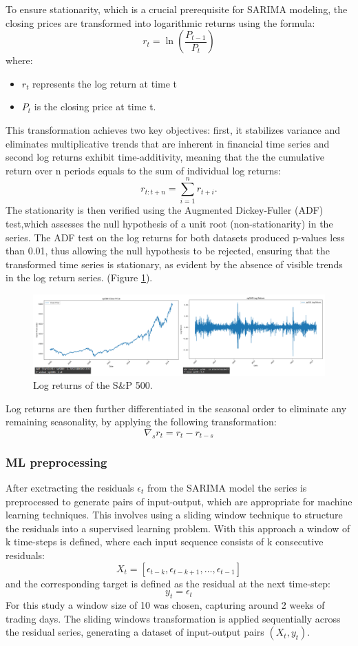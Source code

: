 To ensure stationarity, which is a crucial prerequisite for SARIMA modeling, the closing prices are transformed into logarithmic returns using the formula:
\[
r_t = \ln\left(\frac{P_{t-1}}{P_t}\right)
\]
where: 
\begin{itemize}
    \item $r_t$ represents the log return at time t
    \item $P_t$ is the closing price at time t.
\end{itemize}
This transformation achieves two key objectives: first, it stabilizes variance and eliminates multiplicative trends that are inherent in financial time series and second log returns exhibit time-additivity, meaning that the the cumulative return over n periods equals to the sum of individual log returns:
\[
r_{t:t+n} = \sum_{i=1}^{n} r_{t+i}.
\]
The stationarity is then verified using the Augmented Dickey-Fuller (ADF) test,which assesses the null hypothesis of a unit root (non-stationarity) in the series. The ADF test on the log returns for both datasets produced p-values less than 0.01, thus allowing the null hypothesis to be rejected, ensuring that the transformed time series is stationary, as evident by the absence of visible trends in the log return series. (Figure \ref{fig:Log returns}).
\begin{figure}[H]
    \centering
    \includegraphics[width=1\textwidth]{Machine_learning_thesis/Images/Log returns.png}
    \caption{Log returns of the S\&P 500.} 
    \label{fig:Log returns}
\end{figure}
Log returns are then further differentiated in the seasonal order to eliminate any remaining seasonality, by applying the following transformation: 
\[
\nabla_s r_t = r_t - r_{t-s}
\]

\subsubsection{ML preprocessing}

After exctracting the residuals $\epsilon_t$ from the SARIMA model the series is preprocessed to generate pairs of input-output, which are appropriate for machine learning techniques. This involves using a sliding window technique to structure the residuals into a supervised learning problem. With this approach a window of k time-steps is defined, where each input sequence consists of k consecutive residuals:
\[
X_t = [\epsilon_{t-k}, \epsilon_{t-k+1}, \dots, \epsilon_{t-1}]
\]
and the corresponding target is defined as the residual at the next time-step:
\[
y_t = \epsilon_t
\]
For this study a window size of 10 was chosen, capturing around 2 weeks of trading days. The sliding windows transformation is applied sequentially across the residual series, generating a dataset of input-output pairs $(X_t, y_t)$. 

